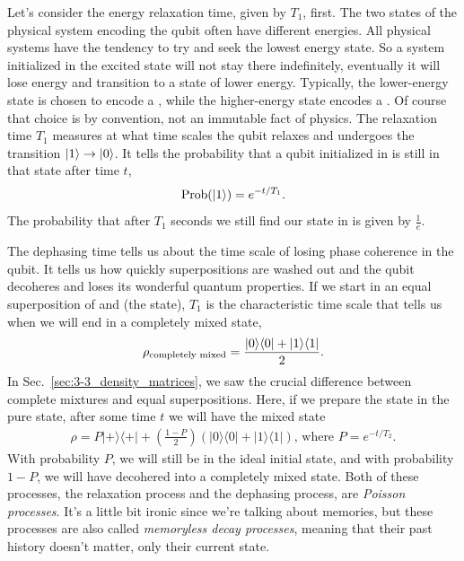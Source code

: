 Let's consider the energy relaxation time, given by $T_1$, first.
The two states of the physical system encoding the qubit often have different energies.
All physical systems have the tendency to try and seek the lowest energy state.
So a system initialized in the excited state will not stay there indefinitely, eventually it will lose energy and transition to a state of lower energy.
Typically, the lower-energy state is chosen to encode a , while the higher-energy state encodes a .
Of course that choice is by convention, not an immutable fact of physics.
The relaxation time $T_1$ measures at what time scales the qubit relaxes and undergoes the transition $\left| 1 \right\rangle\rightarrow\left| 0 \right\rangle$.
It tells the probability that a qubit initialized in  is still in that state after time $t$,
\begin{equation}
    \operatorname{Prob}(\left| 1 \right\rangle)=e^{-t / T_1}.
\end{equation}
The probability that after $T_1$ seconds we still find our state in  is given by $\frac{1}{e}$.

The dephasing time tells us about the time scale of losing phase coherence in the qubit.
It tells us how quickly superpositions are washed out and the qubit decoheres and loses its wonderful quantum properties.
If we start in an equal superposition of  and  (the \ket{+} state), $T_1$ is the characteristic time scale that tells us when we will end in a completely mixed state,
\begin{equation}
\begin{aligned}
\rho_{\textrm{completely mixed}} =\frac{|0 \rangle \langle 0|+|1 \rangle \langle 1|}{2}.
\end{aligned}
\end{equation}
In Sec.~\ref{sec:3-3_density_matrices}, we saw the crucial difference between complete mixtures and equal superpositions. Here, if we prepare the state in the pure state, after some time $t$ we will have the mixed state
\begin{equation}
\begin{aligned}
\rho=P|+\rangle\langle+|+\left(\frac{1-P}{2}\right)(|0\rangle\langle 0|+| 1\rangle\langle 1|)\text{, where }  P=e^{-t / T_2}.
\end{aligned}
\end{equation}
With probability $P$, we will still be in the ideal initial state, and with probability $1-P$, we will have decohered into a completely mixed state. Both of these processes, the relaxation process and the dephasing process, are \emph{Poisson processes}. It's a little bit ironic since we're talking about memories, but these processes are also called \emph{memoryless decay processes}, meaning that their past history doesn't matter, only their current state.

